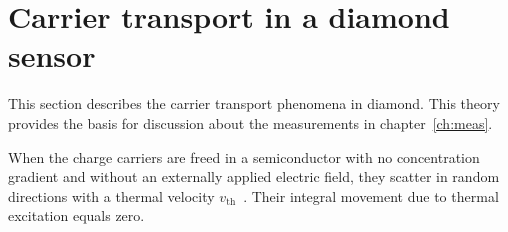 \section{Carrier transport in a diamond sensor} 
\label{sec:carrtransp}
This section describes the carrier transport phenomena in diamond. This theory provides the basis for discussion about the measurements in chapter~\ref{ch:meas}. 

When the charge carriers are freed in a semiconductor with no concentration gradient and without an externally applied electric field, they scatter in random directions with a thermal velocity $v_{\mathrm{th}}$~\cite{}. Their integral movement due to thermal excitation equals zero. 

